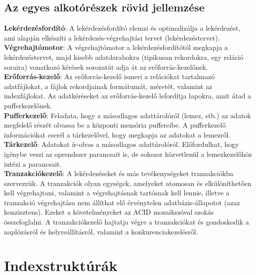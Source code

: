 \documentclass[margin=0px]{article}
\begin{document}
	\subsection{Az egyes alkotórészek rövid jellemzése}
	\noindent \textbf{Lekérdezésfordító}: A lekérdezésfordító elemzi és optimalizálja a lekérdezést, ami alapján
	elkészíti a lekérdezés-végrehajtási tervet (lekérdezéstervet).\\
	
	\noindent \textbf{Végrehajtómotor}: A végrehajtómotor a lekérdezésfordítótól megkapja a lekérdezéstervet, majd kisebb
	adatdarabokra (tipikusan rekordokra, egy reláció soraira) vonatkozó kérések sorozatát adja át az erőforrás-kezelőnek.\\
	
	\noindent \textbf{Erőforrás-kezelő}: Az erőforrás-kezelő ismeri a relációkat tartalmazó adatfájlokat, a fájlok
	rekordjainak formátumát, méretét, valamint az indexfájlokat. Az adatkéréseket az erőforrás-kezelő lefordítja lapokra,
	amit átad a pufferkezelőnek.\\
	
	\noindent \textbf{Pufferkezelő}: Feladata, hogy a másodlagos adattárolóról (lemez, stb.) az adatok megfelelő részét olvassa
	be a központi memória puffereibe. A pufferkezelő információkat cserél a tárkezelővel, hogy megkapja az adatokat
	a lemezről.\\
	
	\noindent \textbf{Tárkezelő}: Adatokat ír-olvas a másodlagos adattárolóról. Előfordulhat, hogy igénybe veszi az oprendszer
	parancsait is, de sokszor közvetlenül a lemezkezelőhöz intézi a parancsait.\\
	
	\noindent \textbf{Tranzakciókezelő}: A lekérdezéseket és más tevékenységeket tranzakciókba szervezzük. A tranzakciók olyan
	egységek, amelyeket atomosan és elkülöníthetően kell végrehajtani, valamint a végrehajtásnak tartósnak kell lennie, illetve
	a tranzakció végrehajtása nem állíthat elő érvénytelen adatbázis-állapotot (azaz konzisztens). Ezeket a követelményeket
	az ACID mozaikszóval szokás összefoglalni. A tranzakciókezelő hajtatja végre a tranzakciókat és gondoskodik a naplózásról
	és helyreállításról, valamint a konkurenciakezelésről.\\
	
	\section{Indexstruktúrák}
	
\end{document}
